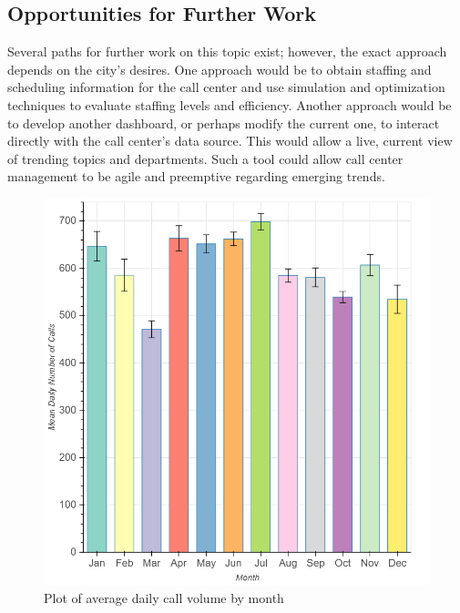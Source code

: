 \documentclass{article}
\begin{document}
	\subsection{Opportunities for Further Work}

Several paths for further work on this topic exist; however, the exact approach depends on the city's desires.  One approach would be to obtain staffing and scheduling information for the call center and use simulation and optimization techniques to evaluate staffing levels and efficiency.  Another approach would be to develop another dashboard, or perhaps modify the current one, to interact directly with the call center's data source.  This would allow a live, current view of trending topics and departments.  Such a tool could allow call center management to be agile and preemptive regarding emerging trends.



\begin{thebibliography}{9}


\end{thebibliography}
\newpage

\begin{figure}[p]
  \includegraphics[scale=.27]{month_bar.png}
  \caption{Plot of average daily call volume by month}
\end{figure}
\end{document}
